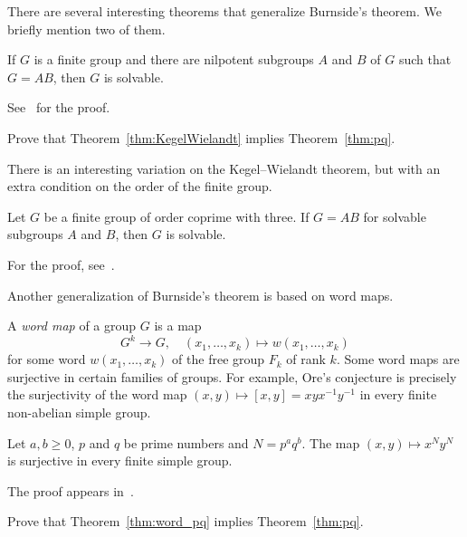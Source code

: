 
There are several interesting theorems that generalize Burnside’s theorem. 
We briefly mention two of them.

\begin{optional}
\begin{theorem}
    \label{thm:KegelWielandt}
    If $G$ is a finite group and there are nilpotent subgroups 
    $A$ and $B$ of $G$ such that 
    $G=AB$, then $G$ is solvable.
\end{theorem}

See~\cite[Theorem 2.4.3]{MR1211633} for the proof.

\begin{xca}
     Prove that Theorem~\ref{thm:KegelWielandt} 
     implies Theorem~\ref{thm:pq}.
\end{xca}
\end{optional}

There is an interesting variation on the Kegel--Wielandt theorem, but with an extra condition on the
order of the finite group. 

\begin{optional}
\begin{theorem}[Syskin]
    Let $G$ be a finite group of order coprime with three. If 
    $G=AB$ for solvable subgroups $A$ and $B$, then $G$ is 
    solvable. 
\end{theorem}

For the proof, see~\cite{MR537379}. 
\end{optional}

Another generalization of Burnside's theorem
is based on word maps. 

\begin{optional}
A \emph{word map} 
of a group $G$ is a map 
\[
G^k\to G,\quad 
(x_1,\dots,x_k)\mapsto w(x_1,\dots,x_k)
\]
for some word $w(x_1,\dots,x_k)$ of the free group $F_k$ of rank $k$. 
Some word maps are surjective in certain families of groups. For example, 
Ore's conjecture is precisely the surjectivity of the word map
$(x,y)\mapsto [x,y]=xyx^{-1}y^{-1}$ in every finite non-abelian simple 
group. 

\begin{theorem}
\label{thm:word_pq}
    Let $a,b\geq0$, $p$ and $q$ be prime numbers and $N=p^aq^b$. The map 
    $(x,y)\mapsto x^Ny^N$ is surjective in every finite simple group. 
\end{theorem}

The proof appears in~\cite{MR3827208}. 

\begin{xca}
\label{xca:word_maps}
    Prove that Theorem~\ref{thm:word_pq} implies Theorem~\ref{thm:pq}. 
\end{xca}
\end{optional}

